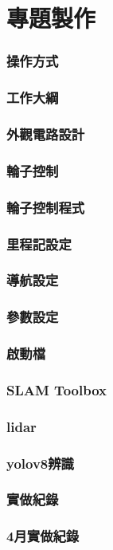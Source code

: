 \documentclass{article}
\begin{document}
\part{專題製作}
\section{操作方式}

\section{工作大綱}

\section{外觀電路設計}



\clearpage
\section{輪子控制}

\section{輪子控制程式}


\section{里程記設定}

\section{導航設定}

\clearpage
\section{參數設定}

\section{啟動檔}

\section{SLAM Toolbox}

\section{lidar}

\section{yolov8辨識}


\section{實做紀錄}

\section{4月實做紀錄}

\end{document}

